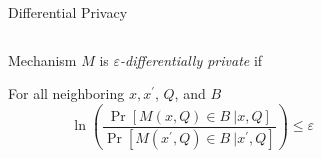 \begin{frame}{Differential Privacy}
\begin{columns}[T] %
\begin{column}{.58\textwidth}
Mechanism $M$ is \emph{$\varepsilon$-differentially private} if
	\begin{wideitemize}
		\item For all neighboring $x,x^{\prime}$, $Q$, and $B$
		\begin{equation*}
		\ln\left(\frac{\Pr \left[ M(x,Q)\in B \ |x,Q\right]}{\Pr \left[
			M(x^{\prime },Q)\in B \ |x^{\prime},Q\right]}\right)
			 \leq \varepsilon 
	    \end{equation*}%
	\end{wideitemize}
\end{column}%
\hfill%
\begin{column}{.38\textwidth}
\end{column}%
\end{columns}
\end{frame}

